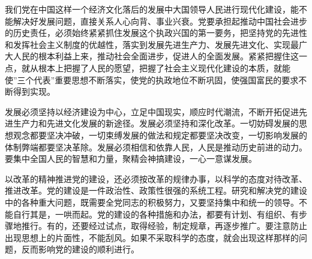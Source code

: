 \documentclass[adobefonts]{njuthesis}
\begin{document}
我们党在中国这样一个经济文化落后的发展中大国领导人民进行现代化建设，能不能解决好发展问题，直接关系人心向背、事业兴衰。党要承担起推动中国社会进步的历史责任，必须始终紧紧抓住发展这个执政兴国的第一要务，把坚持党的先进性和发挥社会主义制度的优越性，落实到发展先进生产力、发展先进文化、实现最广大人民的根本利益上来，推动社会全面进步，促进人的全面发展。紧紧把握住这一点，就从根本上把握了人民的愿望，把握了社会主义现代化建设的本质，就能使”三个代表”重要思想不断落实，使党的执政地位不断巩固，使强国富民的要求不断得到实现。 

发展必须坚持以经济建设为中心，立足中国现实，顺应时代潮流，不断开拓促进先进生产力和先进文化发展的新途径。发展必须坚持和深化改革。一切妨碍发展的思想观念都要坚决冲破，一切束缚发展的做法和规定都要坚决改变，一切影响发展的体制弊端都要坚决革除。发展必须相信和依靠人民，人民是推动历史前进的动力。要集中全国人民的智慧和力量，聚精会神搞建设，一心一意谋发展。 



\begin{acknowledgement}
以改革的精神推进党的建设，还必须按改革的规律办事，以科学的态度对待改革、推进改革。党的建设是一件政治性、政策性很强的系统工程。研究和解决党的建设中的各种重大问题，既需要全党同志的积极努力，又要坚持集中和统一的领导。不能自行其是，一哄而起。党的建设的各种措施和办法，都要有计划、有组织、有步骤地推行。有的，还要经过试点，取得经验，制定规章，再逐步推广。要注意防止出现思想上的片面性，不能刮风。如果不采取科学的态度，就会出现这样那样的问题，反而影响党的建设的顺利进行。
\end{acknowledgement}

\end{document}
